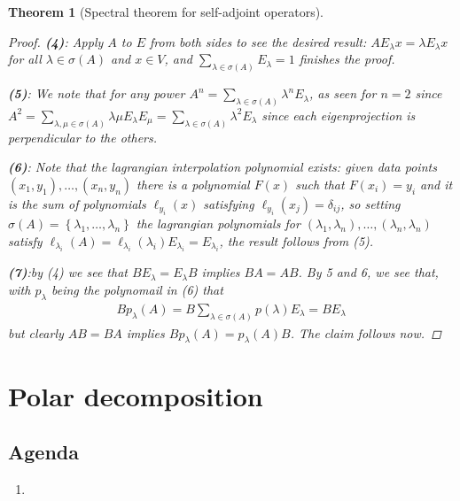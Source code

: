 \documentclass[10pt,twoside,openany,final]{memoir}
\theoremstyle{break}
\newtheorem{theorem}[section]{Theorem}
\theoremstyle{Break}
\begin{document}
\begin{theorem}[Spectral theorem for self-adjoint operators]
\begin{proof}
		\noindent\textbf{(4)}: Apply $A$ to $E$ from both sides to see the desired result: $AE_\lambda x = \lambda E_\lambda x$ for all $\lambda \in \sigma(A)$ and $x \in V$, and $\sum_{\lambda \in \sigma(A)}E_\lambda=1$ finishes the proof.
		
		\noindent\textbf{(5)}: We note that for any power $A^n=\sum_{\lambda \in \sigma(A)} \lambda^n E_{\lambda}$, as seen for $n=2$ since $A^2=\sum_{\lambda, \mu \in \sigma(A)}\lambda \mu E_{\lambda} E_\mu= \sum_{\lambda \in \sigma(A)} \lambda^2 E_\lambda$ since each eigenprojection is perpendicular to the others.

		\noindent\textbf{(6)}: Note that the lagrangian interpolation polynomial exists: given data points $(x_1,y_1),\dots,(x_n,y_n)$ there is a polynomial $F(x)$ such that $F(x_i)=y_i$ and it is the sum of polynomials $\ell_{y_i}(x)$ satisfying $\ell_{y_i}(x_j)=\delta_{ij}$, so setting $\sigma(A)=\left\{ \lambda_1,\dots,\lambda_n \right\}$ the lagrangian polynomials for $(\lambda_1,\lambda_n),\dots,(\lambda_n,\lambda_n)$ satisfy $\ell_{\lambda_i}(A)=\ell_{\lambda_i}(\lambda_i)E_{\lambda_i}=E_{\lambda_i}$, the result follows from (5).

		\noindent\textbf{(7)}:by (4) we see that $B E_\lambda = E_\lambda B$ implies $BA=AB$. By 5 and 6, we see that, with $p_{\lambda}$ being the polynomail in (6) that
		\begin{align*}
			B p_\lambda(A)=B\sum_{\lambda \in \sigma(A)} p(\lambda) E_{\lambda} = B E_\lambda
		\end{align*}
		but clearly $AB=BA$ implies $ Bp_{\lambda}(A)=p_{\lambda}(A)B$. The claim follows now.
	\end{proof}
\end{theorem}

\chapter{Polar decomposition}
\section*{Agenda}
\begin{enumerate}
	\item 
\end{enumerate}
\end{document}
